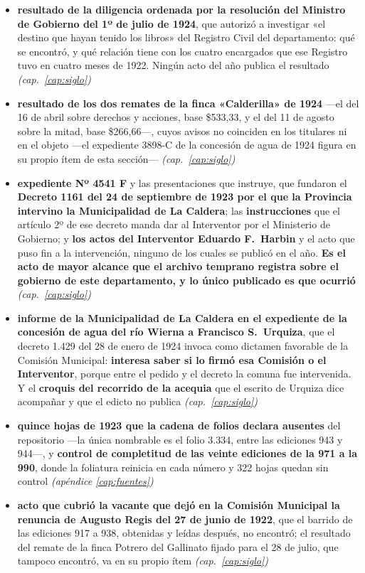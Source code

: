 \begin{itemize}[leftmargin=*]
\item \textbf{resultado de la diligencia ordenada por la resolución del Ministro de Gobierno del 1º de julio de 1924}, que autorizó a investigar «el destino que hayan tenido los libros» del Registro Civil del departamento: qué se encontró, y qué relación tiene con los cuatro encargados que ese Registro tuvo en cuatro meses de 1922. Ningún acto del año publica el resultado \textit{(cap.\ \ref{cap:siglo})}
\item \textbf{resultado de los dos remates de la finca «Calderilla» de 1924} ---el del 16 de abril sobre derechos y acciones, base \$533,33, y el del 11 de agosto sobre la mitad, base \$266,66---, cuyos avisos no coinciden en los titulares ni en el objeto ---el expediente 3898-C de la concesión de agua de 1924 figura en su propio ítem de esta sección--- \textit{(cap.\ \ref{cap:siglo})}
\item \textbf{expediente Nº 4541 F} y las presentaciones que instruye, que fundaron el \textbf{Decreto 1161 del 24 de septiembre de 1923 por el que la Provincia intervino la Municipalidad de La Caldera}; las \textbf{instrucciones} que el artículo 2º de ese decreto manda dar al Interventor por el Ministerio de Gobierno; y \textbf{los actos del Interventor Eduardo F.\ Harbin} y el acto que puso fin a la intervención, ninguno de los cuales se publicó en el año. \textbf{Es el acto de mayor alcance que el archivo temprano registra sobre el gobierno de este departamento, y lo único publicado es que ocurrió} \textit{(cap.\ \ref{cap:siglo})}
\item \textbf{informe de la Municipalidad de La Caldera en el expediente de la concesión de agua del río Wierna a Francisco S.\ Urquiza}, que el decreto 1.429 del 28 de enero de 1924 invoca como dictamen favorable de la Comisión Municipal: \textbf{interesa saber si lo firmó esa Comisión o el Interventor}, porque entre el pedido y el decreto la comuna fue intervenida. Y el \textbf{croquis del recorrido de la acequia} que el escrito de Urquiza dice acompañar y que el edicto no publica \textit{(cap.\ \ref{cap:siglo})}
\item \textbf{quince hojas de 1923 que la cadena de folios declara ausentes} del repositorio ---la única nombrable es el folio 3.334, entre las ediciones 943 y 944---, y \textbf{control de completitud de las veinte ediciones de la 971 a la 990}, donde la foliatura reinicia en cada número y 322 hojas quedan sin control \textit{(apéndice \ref{cap:fuentes})}
\item \textbf{acto que cubrió la vacante que dejó en la Comisión Municipal la renuncia de Augusto Regis del 27 de junio de 1922}, que el barrido de las ediciones 917 a 938, obtenidas y leídas después, no encontró; el resultado del remate de la finca Potrero del Gallinato fijado para el 28 de julio, que tampoco encontró, va en su propio ítem \textit{(cap.\ \ref{cap:siglo})}

\end{itemize}
